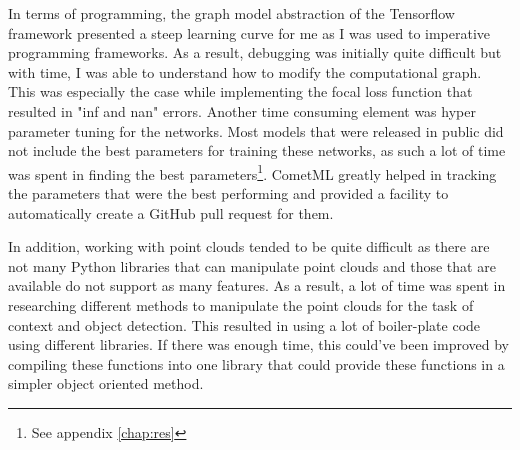 In terms of programming, the graph model abstraction of the Tensorflow framework presented a steep learning curve for me as I was used to imperative programming frameworks. As a result, debugging was initially quite difficult but with time, I was able to understand how to modify the computational graph. This was especially the case while implementing the focal loss function that resulted in "inf and nan" errors. Another time consuming element was hyper parameter tuning for the networks. Most models that were released in public did not include the best parameters for training these networks, as such a lot of time was spent in finding the best parameters\footnote{See appendix {\ref{chap:res}}}. CometML greatly helped in tracking the parameters that were the best performing and provided a facility to automatically create a GitHub pull request for them. 	

 In addition, working with point clouds tended to be quite difficult as there are not many Python libraries that can manipulate point clouds and those that are available do not support as many features. As a result, a lot of time was spent in researching different methods to manipulate the point clouds for the task of context and object detection. This resulted in using a lot of boiler-plate code using different libraries. If there was enough time, this could've been improved by compiling these functions into one library that could provide these functions in a simpler object oriented method. 
 